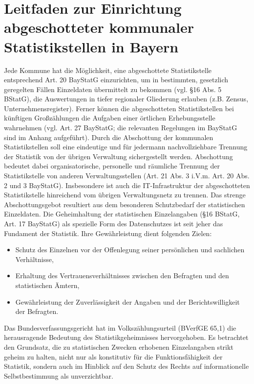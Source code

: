 \chapter[Leitfaden Abschottung]{Leitfaden zur Einrichtung abgeschotteter kommunaler Statistikstellen in Bayern}
\minitoc

Jede Kommune hat die Möglichkeit, eine abgeschottete Statistikstelle entsprechend Art. 20 BayStatG einzurichten, um in bestimmten, gesetzlich geregelten Fällen Einzeldaten übermittelt zu bekommen (vgl. \S 16 Abs. 5 BStatG), die Auswertungen in tiefer regionaler Gliederung erlauben (z.B. Zensus, Unternehmensregister). Ferner können die abgeschotteten Statistikstellen bei künftigen Großzählungen die Aufgaben einer örtlichen Erhebungsstelle wahrnehmen (vgl. Art. 27 BayStatG; die relevanten Regelungen im BayStatG sind im Anhang aufgeführt). Durch die Abschottung der kommunalen Statistikstellen soll eine eindeutige und für jedermann nachvollziehbare Trennung der Statistik von der übrigen Verwaltung sichergestellt werden. Abschottung bedeutet dabei organisatorische, personelle und räumliche Trennung der Statistikstelle von anderen Verwaltungsstellen (Art. 21 Abs. 3 i.V.m. Art. 20 Abs. 2 und 3 BayStatG). Insbesondere ist auch die IT-Infrastruktur der abgeschotteten Statistikstelle hinreichend vom übrigen Verwaltungsnetz zu trennen. Das strenge Abschottungsgebot resultiert aus dem besonderen Schutzbedarf der statistischen Einzeldaten. Die Geheimhaltung der statistischen Einzelangaben (\S 16 BStatG, Art. 17 BayStatG) als spezielle Form des Datenschutzes ist seit jeher das Fundament der Statistik. Ihre Gewährleistung dient folgenden Zielen:
\begin{itemize}
    \item Schutz des Einzelnen vor der Offenlegung seiner persönlichen und sachlichen Ver\-hält\-nisse,
    \item Erhaltung des Vertrauensverhältnisses zwischen den Befragten und den statistischen Ämtern,
    \item Gewährleistung der Zuverlässigkeit der Angaben und der Berichtswilligkeit der Befragten.
\end{itemize}
Das Bundesverfassungsgericht hat im Volkszählungsurteil (BVerfGE 65,1) die herausragende Bedeutung des Statistikgeheimnisses hervorgehoben. Es betrachtet den Grundsatz, die zu statistischen Zwecken erhobenen Einzelangaben strikt geheim zu halten, nicht nur als konstitutiv für die Funktionsfähigkeit der Statistik, sondern auch im Hinblick auf den Schutz des Rechts auf informationelle Selbstbestimmung als unverzichtbar.
